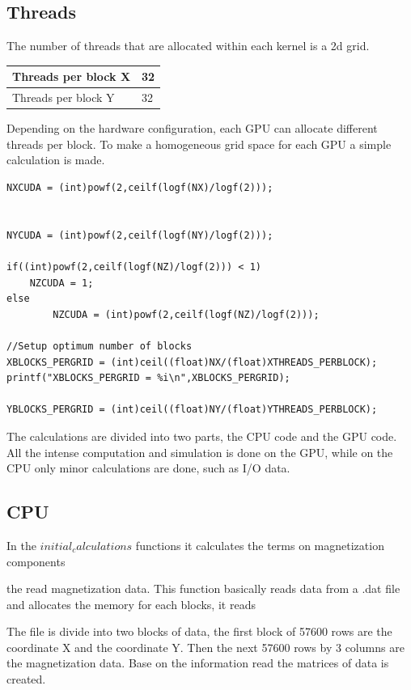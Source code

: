 \subsection{Threads}

The number of threads that are allocated within each kernel is a 2d grid.

\begin{table}[h]
\centering
\begin{tabular}{| l | l |}
\hline
Threads per block  X   & 32       \\
\hline
Threads per block Y     & 32         \\
\hline
\end{tabular}
\end{table}

Depending on the hardware configuration, each GPU can allocate different threads per block. To make a homogeneous grid space for each GPU a simple calculation is made.

\begin{lstlisting}[frame=none]
NXCUDA = (int)powf(2,ceilf(logf(NX)/logf(2)));


NYCUDA = (int)powf(2,ceilf(logf(NY)/logf(2)));

if((int)powf(2,ceilf(logf(NZ)/logf(2))) < 1)
	NZCUDA = 1;
else
        NZCUDA = (int)powf(2,ceilf(logf(NZ)/logf(2)));

//Setup optimum number of blocks
XBLOCKS_PERGRID = (int)ceil((float)NX/(float)XTHREADS_PERBLOCK);
printf("XBLOCKS_PERGRID = %i\n",XBLOCKS_PERGRID);

YBLOCKS_PERGRID = (int)ceil((float)NY/(float)YTHREADS_PERBLOCK);
\end{lstlisting}


The calculations are divided into two parts, the CPU code and the GPU code. All the intense computation and simulation is done on the GPU, while on the CPU only minor calculations are done, such as I/O  data.

\subsection{CPU}
In the $initial_calculations$ functions it calculates the terms on magnetization components


the read magnetization data.
This function basically reads data from a .dat file and allocates the memory for each blocks, it reads

The file is divide into two blocks of data, the first block of 57600 rows are the coordinate X and the coordinate Y. Then the next 57600 rows by 3 columns are the magnetization data. Base on the information read the matrices of data is created.

